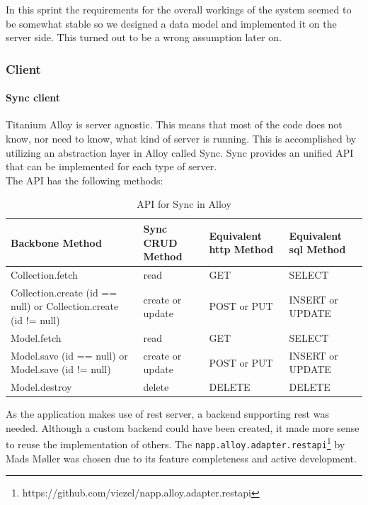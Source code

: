 \documentclass[11pt]{book}
\begin{document}
In this sprint the requirements for the overall workings of the system seemed to be somewhat stable so we designed a data model and implemented it on the server side. This turned out to be a wrong assumption later on.

\subsubsection{Client}
\paragraph{Sync client}
Titanium Alloy is server agnostic. This means that most of the code does not know, nor need to know, what kind of server is running. This is accomplished by utilizing an abstraction layer in Alloy called Sync. Sync provides an unified API that can be implemented for each type of server.\\
The API has the following methods:

\begin{table}[H]
    \centering
    \begin{tabular}{| p{3.5cm} | p{3.5cm} | p{3.5cm} | p{2.5cm} |}
        \hline
        Backbone Method & Sync CRUD Method & Equivalent \gls{http} Method & Equivalent \gls{sql} Method\\
        \hline
        Collection.fetch & read & GET & SELECT\\
        \hline
        Collection.create (id == null) or Collection.create (id != null) & create or update & POST or PUT & INSERT or UPDATE\\
        \hline
        Model.fetch & read    & GET & SELECT\\
        \hline
        Model.save (id == null) or Model.save (id != null) & create or update & POST or PUT & INSERT or UPDATE\\
        \hline
        Model.destroy & delete & DELETE & DELETE\\
        \hline
    \end{tabular}
    \caption{API for Sync in Alloy\cite{titaniumAlloySync}}
    \label{tab:phase_sprint2_model}
\end{table}

As the application makes use of \gls{rest} server, a backend supporting \gls{rest} was needed. Although a custom backend could have been created, it made more sense to reuse the implementation of others. The \texttt{napp.alloy.adapter.restapi}\footnote{https://github.com/viezel/napp.alloy.adapter.restapi} by Mads Møller was chosen due to its feature completeness and active development.
\end{document}
